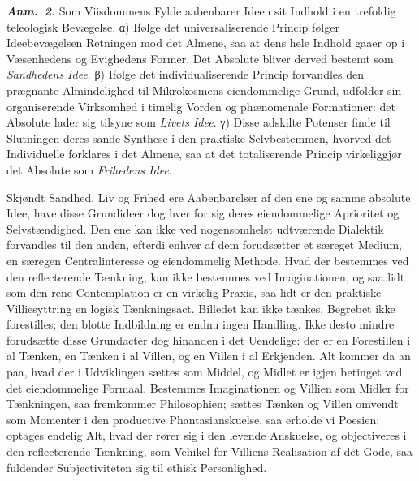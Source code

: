 \documentclass[12pt]{book}
\newcommand{\anm}[1]{\emph{\textbf{Anm.~#1.}}}
\newcommand{\opage}[1]{\marginnote{\footnotesize\textit{[#1]}}}
\begin{document}
\anm{2} Som Viisdommens Fylde aabenbarer Ideen sit Indhold i en trefoldig teleologisk
Bevægelse. α) Ifølge det universaliserende Princip følger Ideebevægelsen Retningen mod
det Almene, saa at dens hele Indhold gaaer op i Væsenhedens og Evighedens Former. Det
Absolute bliver derved bestemt som \emph{Sandhedens Idee}. β) Ifølge det
individualiserende Princip forvandles den prægnante Almindelighed til Mikrokosmens
eiendommelige Grund, udfolder sin organiserende Virksomhed i timelig Vorden og
phænomenale Formationer: det Absolute lader sig tilsyne som \emph{Livets Idee}.
γ) Disse adskilte Potenser finde til Slutningen deres sande Synthese i den praktiske
Selvbestemmen, hvorved det Individuelle forklares i det Almene, saa at det
totaliserende Princip virkeliggjør det Absolute som \emph{Frihedens Idee}.

Skjøndt Sandhed, Liv og Frihed ere Aabenbarelser af den ene og samme absolute Idee,
\opage{250} have disse Grundideer dog hver for sig deres eiendommelige Aprioritet og
Selvstændighed. Den ene kan ikke ved nogensomhelst udtværende Dialektik forvandles til
den anden, efterdi enhver af dem forudsætter et særeget Medium, en særegen
Centralinteresse og eiendommelig Methode. Hvad der bestemmes ved den reflecterende
Tænkning, kan ikke bestemmes ved Imaginationen, og saa lidt som den rene Contemplation
er en virkelig Praxis, saa lidt er den praktiske Villiesyttring en logisk
Tænkningsact. Billedet kan ikke tænkes, Begrebet ikke forestilles; den blotte
Indbildning er endnu ingen Handling. Ikke desto mindre forudsætte disse Grundacter dog
hinanden i det Uendelige: der er en Forestillen i al Tænken, en Tænken i al Villen, og
en Villen i al Erkjenden. Alt kommer da an paa, hvad der i Udviklingen sættes som
Middel, og Midlet er igjen betinget ved det eiendommelige Formaal. Bestemmes
Imaginationen og Villien som Midler for Tænkningen, saa fremkommer Philosophien;
sættes Tænken og Villen omvendt som Momenter i den productive Phantasianskuelse, saa
erholde vi Poesien; optages endelig Alt, hvad der rører sig i den levende Anskuelse,
og objectiveres i den reflecterende Tænkning, som Vehikel for Villiens Realisation af
det Gode, saa fuldender Subjectiviteten sig til ethisk Personlighed.
\end{document}
